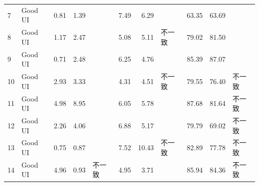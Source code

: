 \begin{landscape}
\begin{table}[htbp]
\begin{tabular}{llrrlrrlrrl}
7                       & Good UI                & 0.81                     & 1.39                     &                        & 7.49                     & 6.29                     &                        & 63.35                    & 63.69                    &                        \\
8                       & Good UI                & 1.17                     & 2.47                     &                        & 5.08                     & 5.11                     & 不一致                    & 79.02                    & 81.50                    &                        \\
9                       & Good UI                & 0.71                     & 2.48                     &                        & 6.25                     & 4.76                     &                        & 85.39                    & 87.07                    &                        \\
10                      & Good UI                & 2.93                     & 3.33                     &                        & 4.31                     & 4.51                     & 不一致                    & 79.55                    & 76.40                    & 不一致                    \\
11                      & Good UI                & 4.98                     & 8.95                     &                        & 6.05                     & 5.78                     &                        & 87.68                    & 81.64                    & 不一致                    \\
12                      & Good UI                & 2.26                     & 4.06                     &                        & 6.88                     & 5.17                     &                        & 79.79                    & 69.02                    & 不一致                    \\
13                      & Good UI                & 0.75                     & 0.87                     &                        & 7.52                     & 10.43                    & 不一致                    & 82.89                    & 77.78                    & 不一致                    \\
14                      & Good UI                & 4.96                     & 0.93                     & 不一致                    & 4.95                     & 3.71                     &                        & 85.94                    & 84.36                    & 不一致                    \\

\end{tabular}
\end{table}
\end{landscape}

